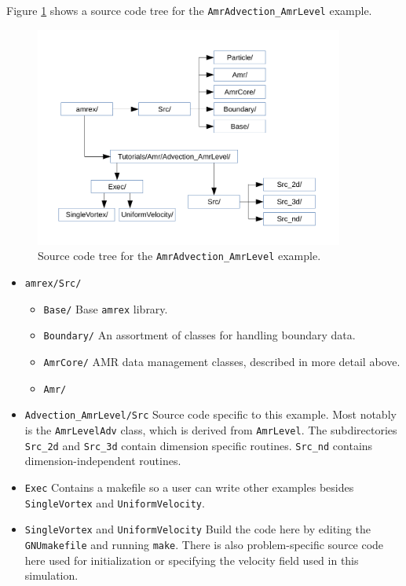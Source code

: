 Figure \ref{fig:AmrAdvection_AmrLevel_flowchart} shows a source
code tree for the {\tt AmrAdvection\_AmrLevel} example.
\begin{figure}[htb]
\begin{center}
\includegraphics[width=4in]{./AmrLevel/figs/flowchart.pdf}
\caption{\label{fig:AmrAdvection_AmrLevel_flowchart} Source code tree for the 
         {\tt AmrAdvection\_AmrLevel} example.}
\end{center}
\end{figure}
\begin{itemize}
\item {\tt amrex/Src/}
\begin{itemize}
\item {\tt Base/} Base {\tt amrex} library.
\item {\tt Boundary/} An assortment of classes for handling boundary data.
\item {\tt AmrCore/} AMR data management classes, described in more detail above.
\item {\tt Amr/}
\end{itemize}
\item {\tt Advection\_AmrLevel/Src} Source code specific to this example.  Most notably
is the {\tt AmrLevelAdv} class, which is derived from {\tt AmrLevel}.  The subdirectories {\tt Src\_2d}
and {\tt Src\_3d} contain dimension specific routines.  {\tt Src\_nd} contains dimension-independent routines.
\item {\tt Exec} Contains a makefile so a user can write other examples besides {\tt SingleVortex} and {\tt UniformVelocity}.
\item {\tt SingleVortex} and {\tt UniformVelocity}
Build the code here by editing the {\tt GNUmakefile} and running {\tt make}.  There
is also problem-specific source code here used for initialization or specifying the velocity field used in this
simulation.
\end{itemize}


